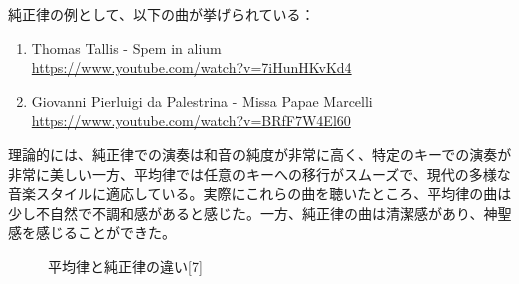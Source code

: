 \documentclass{article}
\begin{document}
\begin{spacing}{1.2}
        純正律の例として、以下の曲が挙げられている：
        \begin{enumerate}[label=\arabic*), before=\begin{spacing}{1.2}, after=\end{spacing}] %
            \item Thomas Tallis - Spem in alium\\
            \url{https://www.youtube.com/watch?v=7iHunHKvKd4}
            \item Giovanni Pierluigi da Palestrina - Missa Papae Marcelli\\
            \url{https://www.youtube.com/watch?v=BRfF7W4El60}
        \end{enumerate}

        理論的には、純正律での演奏は和音の純度が非常に高く、特定のキーでの演奏が非常に美しい一方、平均律では任意のキーへの移行がスムーズで、現代の多様な音楽スタイルに適応している。実際にこれらの曲を聴いたところ、平均律の曲は少し不自然で不調和感があると感じた。一方、純正律の曲は清潔感があり、神聖感を感じることができた。
    \end{spacing}
    \begin{figure}[ht] %
        \centering
        \caption{平均律と純正律の違い[7]}
    \end{figure}
    \FloatBarrier
\end{document}
